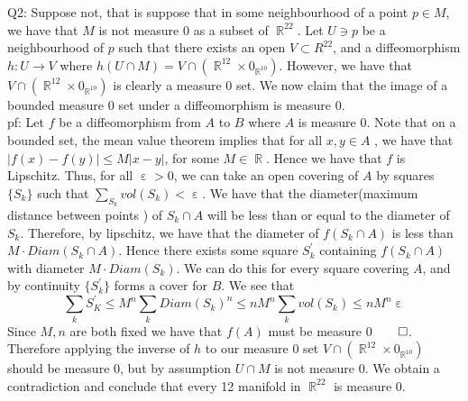 \documentclass[letterpaper]{article}
\DeclareMathOperator{\R}{\mathbb{R}}
\DeclareMathOperator{\ep}{\varepsilon}
\begin{document}
\noindent Q2: Suppose not, that is suppose that in some neighbourhood of a point $p\in M$, we have that $M$ is not measure 0 as a subset of $\R^{22}$. Let $U\ni p$ be a neighbourhood of $p$ such that there exists an open $V\subset R^{22}$, and a diffeomorphism $h:U\to V$ where $h(U\cap M) = V\cap (\R^{12} \times 0_{\R^{10}})$. However, we have that $V\cap (\R^{12} \times 0_{\R^{10}})$ is clearly a measure 0 set. We now claim that the image of a bounded measure 0 set under a diffeomorphism is measure 0. \newline \\ pf: Let $f$ be a diffeomorphism from $A$ to $B$ where $A$ is measure 0. Note that on a bounded set, the mean value theorem implies that for all $x,y \in A$ , we have that $|f(x)-f(y)|\leq M|x-y|$, for some $M\in \R$. Hence we have that $f$ is Lipschitz. Thus, for all $\ep>0$, we can take an open covering of $A$ by squares $\{S_k\}$ such that $\sum_{S_k} vol(S_k) < \ep$. We have that the diameter(maximum distance between points ) of $S_k\cap A $ will be less than or equal to the diameter of $S_k$. 
Therefore, by lipschitz, we have that the diameter of $f(S_k\cap A)$ is less than $M \cdot Diam(S_k\cap A)$. Hence there exists some square $S_k^\prime$ containing $f(S_k\cap A)$ with diameter $M\cdot Diam(S_k)$. We can do this for every square covering $A$, and by continuity $\{S_k^\prime \}$ forms a cover for $B$. We see that $$\sum_{k}S_K^\prime \leq M^n \sum_{k}Diam(S_k)^n \leq nM^n \sum_{k} vol(S_k) \leq nM^n \ep$$
Since $M,n$ are both fixed we have that $f(A)$ must be measure 0$\qed$. 
\newline Therefore applying the inverse of $h$ to our measure 0 set $V\cap (\R^{12} \times 0_{\R^{10}})$ should be measure 0, but by assumption $U\cap M$ is not measure 0. We obtain a contradiction and conclude that every 12 manifold in $\R^{22}$ is measure 0. 
\end{document}
